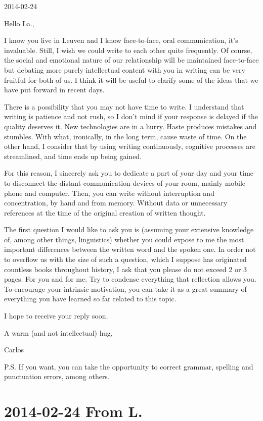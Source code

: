 \documentclass[]{book}
\begin{document}
2014-02-24

Hello La.,

I know you live in Leuven and I know face-to-face, oral communication, it's invaluable. Still, I wish we could write to each other quite frequently. Of course, the social and emotional nature of our relationship will be maintained face-to-face but debating more purely intellectual content with you in writing can be very fruitful for both of us. I think it will be useful to clarify some of the ideas that we have put forward in recent days.

There is a possibility that you may not have time to write. I understand that writing is patience and not rush, so I don't mind if your response is delayed if the quality deserves it. New technologies are in a hurry. Haste produces mistakes and stumbles. With what, ironically, in the long term, cause waste of time. On the other hand, I consider that by using writing continuously, cognitive processes are streamlined, and time ends up being gained.

For this reason, I sincerely ask you to dedicate a part of your day and your time to disconnect the distant-communication devices of your room, mainly mobile phone and computer. Then, you can write without interruption and concentration, by hand and from memory. Without data or unnecessary references at the time of the original creation of written thought.

The first question I would like to ask you is (assuming your extensive knowledge of, among other things, linguistics) whether you could expose to me the most important differences between the written word and the spoken one. In order not to overflow us with the size of such a question, which I suppose has originated countless books throughout history, I ask that you please do not exceed 2 or 3 pages. For you and for me. Try to condense everything that reflection allows you. To encourage your intrinsic motivation, you can take it as a great summary of everything you have learned so far related to this topic.

I hope to receive your reply soon.

A warm (and not intellectual) hug,

Carlos

P.S. If you want, you can take the opportunity to correct grammar, spelling and punctuation errors, among others.

\hypertarget{fromLa20140224}{%
\section*{2014-02-24 From L.}\label{fromLa20140224}}
\end{document}
